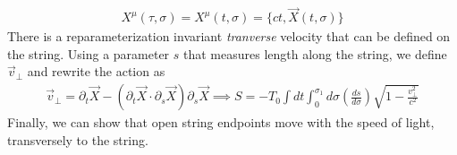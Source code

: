\documentclass[11pt]{article}
\begin{document}
\begin{align*}
    X^\mu(\tau, \sigma) = X^\mu(t, \sigma) = \{ ct, \vec{X}(t, \sigma)\} 
\end{align*}
There is a reparameterization invariant \textit{tranverse} velocity that can be defined on the string. Using a parameter $s$ that measures length along the string, we define $\vec{v}_\perp$ and rewrite the action as
\begin{align*}
    \vec{v}_\perp = \partial_t \vec{X} - (\partial_t \vec{X} \cdot \partial_s \vec{X}) \partial_s \vec{X} \implies S = -T_0 \int dt \int_0^{\sigma_1} d\sigma \left(\frac{ds }{d\sigma} \right) \sqrt{1 - \frac{v_\perp^2}{c^2}} \tag{6.82, 6.88}
\end{align*}
Finally, we can show that open string endpoints move with the speed of light, transversely to the string. 

\newpage 
\end{document}
